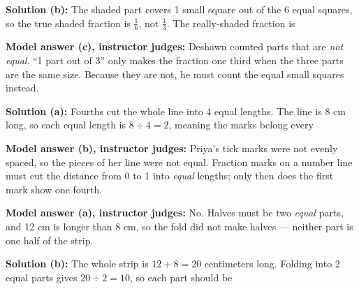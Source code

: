 \documentclass[12pt]{article}
\begin{document}
\textbf{Solution (b):} The shaded part covers 1 small square out of the 6 equal
squares, so the true shaded fraction is $\tfrac{1}{6}$, not $\tfrac{1}{3}$.
The really-shaded fraction is 

\textbf{Model answer (c), instructor judges:} Deshawn counted parts that are
\emph{not equal}. ``1 part out of 3'' only makes the fraction one third when
the three parts are the same size. Because they are not, he must count the
equal small squares instead.


\textbf{Solution (a):} Fourths cut the whole line into 4 equal lengths. The
line is 8 cm long, so each equal length is $8 \div 4 = 2$, meaning the marks
belong every 

\textbf{Model answer (b), instructor judges:} Priya's tick marks were not
evenly spaced, so the pieces of her line were not equal. Fraction marks on a
number line must cut the distance from 0 to 1 into \emph{equal} lengths; only
then does the first mark show one fourth.


\textbf{Model answer (a), instructor judges:} No. Halves must be two
\emph{equal} parts, and 12 cm is longer than 8 cm, so the fold did not make
halves --- neither part is one half of the strip.

\textbf{Solution (b):} The whole strip is $12 + 8 = 20$ centimeters long.
Folding into 2 equal parts gives $20 \div 2 = 10$, so each part should be

\end{document}
